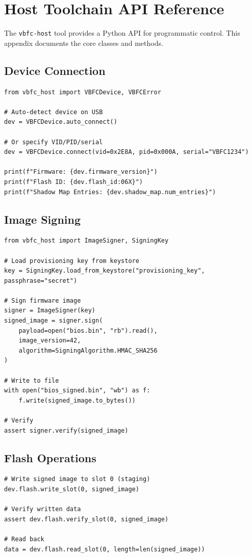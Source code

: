 \section{Host Toolchain API Reference}
\label{app:host_api}

The \texttt{vbfc-host} tool provides a Python API for programmatic control. This appendix documents the core classes and methods.

\subsection{Device Connection}
\begin{lstlisting}[style=vbfcStyle, caption={Device Connection}, label={lst:host_connect}]
from vbfc_host import VBFCDevice, VBFCError

# Auto-detect device on USB
dev = VBFCDevice.auto_connect()

# Or specify VID/PID/serial
dev = VBFCDevice.connect(vid=0x2E8A, pid=0x000A, serial="VBFC1234")

print(f"Firmware: {dev.firmware_version}")
print(f"Flash ID: {dev.flash_id:06X}")
print(f"Shadow Map Entries: {dev.shadow_map.num_entries}")
\end{lstlisting}

\subsection{Image Signing}
\begin{lstlisting}[style=vbfcStyle, caption={Image Signing API}, label={lst:host_sign}]
from vbfc_host import ImageSigner, SigningKey

# Load provisioning key from keystore
key = SigningKey.load_from_keystore("provisioning_key", passphrase="secret")

# Sign firmware image
signer = ImageSigner(key)
signed_image = signer.sign(
    payload=open("bios.bin", "rb").read(),
    image_version=42,
    algorithm=SigningAlgorithm.HMAC_SHA256
)

# Write to file
with open("bios_signed.bin", "wb") as f:
    f.write(signed_image.to_bytes())

# Verify
assert signer.verify(signed_image)
\end{lstlisting}

\subsection{Flash Operations}
\begin{lstlisting}[style=vbfcStyle, caption={Flash Read/Write}, label={lst:host_flash}]
# Write signed image to slot 0 (staging)
dev.flash.write_slot(0, signed_image)

# Verify written data
assert dev.flash.verify_slot(0, signed_image)

# Read back
data = dev.flash.read_slot(0, length=len(signed_image))
\end{lstlisting}


